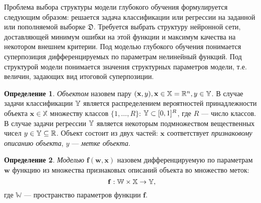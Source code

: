 \documentclass[11pt, a5paper]{dissert}
\theoremstyle{definition}
\newtheorem{defin}{Определение}
\begin{document}
Проблема выбора структуры модели глубокого обучения формулируется следующим образом: решается задача классификации или регрессии на заданной или пополняемой выборке $\mathfrak{D}$. Требуется выбрать структуру нейронной сети, доставляющей минимум ошибки на этой функции и максимум качества на некотором внешнем критерии.
 Под моделью глубокого обучения понимается суперпозиция дифференцируемых по параметрам нелинейный функций. Под структурой модели понимается значения структурных параметров модели, т.е. величин, задающих вид итоговой суперпозиции. 

\begin{defin}
\textit{Объектом} назовем пару $(\mathbf{x}, y), \mathbf{x} \in \mathbb{X} =  \mathbb{R}^n, y \in \mathbb{Y}$. В случае задачи классификации $\mathbb{Y}$ является распределением вероятностей принадлежности объекта $\mathbf{x} \in \mathbb{X}$ множеству классов $\{1, \dots, R\}$: $\mathbb{Y} \subset [0,1]^R$, где $R$ --- число классов. В случае задачи регрессии $\mathbb{Y}$ является некоторым подмножеством вещественных чисел ${y} \in \mathbb{Y}  \subseteq \mathbb{R}$.
Объект состоит из двух частей: $\mathbf{x}$  соответствует \textit{признаковому описанию объекта}, $y$ --- \textit{метке объекта}.
\end{defin}



\begin{defin}
\textit{Моделью} $\mathbf{f}(\mathbf{w}, \mathbf{x})$ назовем дифференцируемую по параметрам $\mathbf{w}$ функцию из множества признаковых описаний объекта во множество меток:
\[
    \mathbf{f}:  \mathbb{W}  \times \mathbb{X} \to \mathbb{Y},
\] 
где $\mathbb{W}$ --- пространство параметров функции $\mathbf{f}$.
\end{defin}
\end{document}
